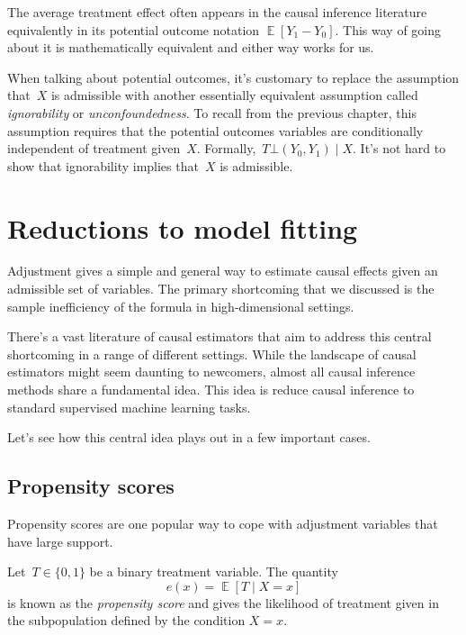 \documentclass{tufte-book}
\begin{document}
The average treatment effect often appears in the causal inference
literature equivalently in its potential outcome notation
\(\mathop\mathbb{E}[Y_1 - Y_0]\). This way of going about it is
mathematically equivalent and either way works for us.

When talking about potential outcomes, it's customary to replace the
assumption that~\(X\) is admissible with another essentially equivalent
assumption called \emph{ignorability} or \emph{unconfoundedness}. To
recall from the previous chapter, this assumption requires that the
potential outcomes variables are conditionally independent of treatment
given~\(X\). Formally,~\(T\bot (Y_0, Y_1)\mid X\). It's not hard to show
that ignorability implies that~\(X\) is
admissible.

\hypertarget{reductions-to-model-fitting}{%
\section{Reductions to model
fitting}\label{reductions-to-model-fitting}}

Adjustment gives a simple and general way to estimate causal effects
given an admissible set of variables. The primary shortcoming that we
discussed is the sample inefficiency of the formula in high-dimensional
settings.

There's a vast literature of causal estimators that aim to address this
central shortcoming in a range of different settings. While the
landscape of causal estimators might seem daunting to newcomers, almost
all causal inference methods share a fundamental idea. This idea is
reduce causal inference to standard supervised machine learning tasks.

Let's see how this central idea plays out in a few important cases.

\hypertarget{propensity-scores}{%
\subsection{Propensity scores}\label{propensity-scores}}

Propensity scores are one popular way to cope with adjustment variables
that have large support.

Let~\(T \in \{ 0, 1 \}\) be a binary treatment variable. The quantity \[
e(x) = \mathop\mathbb{E}[T \mid X=x]
\] is known as the \emph{propensity score} and gives the likelihood of
treatment given in the subpopulation defined by the condition
\(X=x\).
\end{document}
